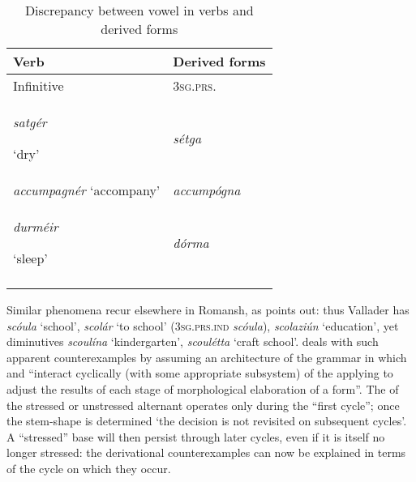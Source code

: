 \documentclass[output=paper,
modfonts
]{LSP/langsci}
\begin{document}

\begin{longtable}[]{@{}ll@{}}
\caption{Discrepancy between vowel  in verbs and derived forms} \\
\lsptoprule
Verb & Derived forms\tabularnewline
\midrule
\endhead
Infinitive & \textsc{3sg.prs.}\tabularnewline
\emph{satgér}

`dry' & \emph{sétga}\tabularnewline
\emph{accumpagnér} `accompany' & \emph{accumpógna}\tabularnewline
\emph{durméir }

`sleep' & \emph{dórma}\tabularnewline
\lspbottomrule
\end{longtable}

\newpage 
Similar phenomena recur elsewhere in Romansh, as \citet[20]{anderson2013stem}
points out: thus Vallader has \emph{scóula} `school', \emph{scolár} `to
school' (\textsc{3sg.prs.ind} \emph{scóula}), \emph{scolaziún}
`education', yet diminutives \emph{scoulína} `kindergarten',
\emph{scoulétta} `craft school'. \citet[28]{anderson2011a} deals with such
apparent counterexamples by assuming an architecture of the grammar in
which  and  ``interact cyclically (with some
appropriate subsystem) of the  applying to adjust the results
of each stage of morphological elaboration of a form''. The  of
the stressed or unstressed  alternant operates only during the
``first cycle''; once the stem-shape is determined `the decision is not
revisited on subsequent cycles'. A ``stressed'' base will then persist
through later cycles, even if it is itself no longer stressed: the
derivational counterexamples can now be explained in terms of the cycle
on which they occur.
\end{document}
